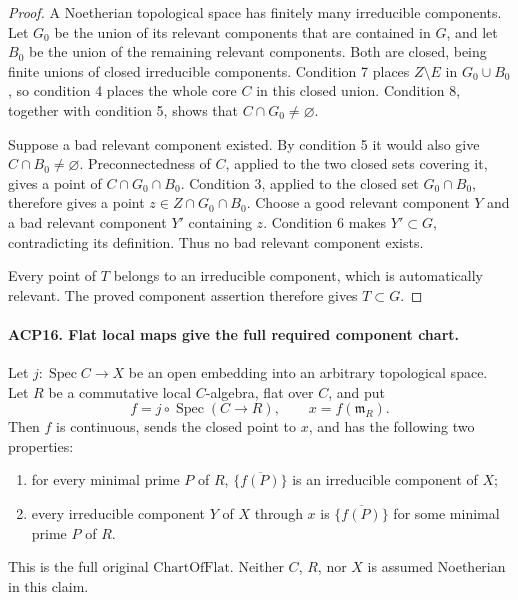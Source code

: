 \begin{proof}
A Noetherian topological space has finitely many irreducible
components.  Let \(G_0\) be the union of its relevant
components that are contained in \(G\), and let \(B_0\) be
the union of the remaining relevant components.  Both are
closed, being finite unions of closed irreducible components.
Condition 7 places \(Z\setminus E\) in \(G_0\cup B_0\),
so condition 4 places the whole core \(C\) in this closed
union.  Condition 8, together with condition 5, shows that
\(C\cap G_0\ne\varnothing\).

Suppose a bad relevant component existed.  By condition 5
it would also give \(C\cap B_0\ne\varnothing\).
Preconnectedness of \(C\), applied to the two closed sets
covering it, gives a point of \(C\cap G_0\cap B_0\).
Condition 3, applied to the closed set \(G_0\cap B_0\),
therefore gives a point \(z\in Z\cap G_0\cap B_0\).
Choose a good relevant component \(Y\) and a bad relevant
component \(Y'\) containing \(z\).  Condition 6 makes
\(Y'\subset G\), contradicting its definition.
Thus no bad relevant component exists.

Every point of \(T\) belongs to an irreducible component,
which is automatically relevant.  The proved component
assertion therefore gives \(T\subset G\).
\end{proof}

\paragraph{ACP16. Flat local maps give the full required component chart.}
\label{claim:ACP16}
Let \(j:\operatorname{Spec}C\to X\) be an open embedding
into an arbitrary topological space.  Let \(R\) be a
commutative local \(C\)-algebra, flat over \(C\), and put
\[
 f=j\circ\operatorname{Spec}(C\to R),
 \qquad x=f(\mathfrak m_R).
\]
Then \(f\) is continuous, sends the closed point to \(x\),
and has the following two properties:
\begin{enumerate}
\item for every minimal prime \(P\) of \(R\),
      \(\overline{\{f(P)\}}\) is an irreducible component of \(X\);
\item every irreducible component \(Y\) of \(X\) through \(x\)
      is \(\overline{\{f(P)\}}\) for some minimal prime \(P\) of \(R\).
\end{enumerate}
This is the full original \(\mathrm{ChartOfFlat}\).  Neither
\(C\), \(R\), nor \(X\) is assumed Noetherian in this claim.

